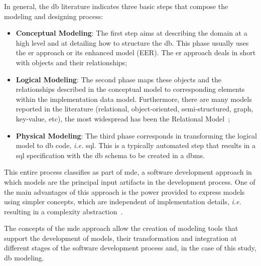 In general, the \ac{db} literature indicates three basic steps that compose the modeling and designing process:
\begin{itemize}
    \item \textbf{Conceptual Modeling}: The first step aims at describing the domain at a high level and at detailing how to structure the \ac{db}.
    This phase usually uses the \ac{er} approach or its enhanced model (EER).
    The \ac{er} approach deals in short with objects and their relationships;
    
    \item \textbf{Logical Modeling}: The second phase maps these objects and the relationships described in the conceptual model to corresponding elements within the implementation data model.
    Furthermore, there are many models reported in the literature (relational, object-oriented, semi-structured, graph, key-value, etc), the most widespread has been the Relational Model~\cite{Codd:1989, Karanikolas:2011, Paredaens:2012, Robinson:2015, Puangsaijai:2017};

    \item \textbf{Physical Modeling}: The third phase corresponds in transforming the logical model to \ac{db} code, \textit{i.e.} \ac{sql}.
This is a typically automated step that results in a \ac{sql} specification with the \ac{db} schema to be created in a \ac{dbms}.
\end{itemize}


This entire process classifies as part of \ac{mde}, a software development approach in which models are the principal input artifacts in the development process.
One of the main advantages of this approach is the power provided to express models using simpler concepts, which are independent of implementation details, \textit{i.e.} resulting in a complexity abstraction~\cite{Brambilla:2017}.

The concepts of the \ac{mde} approach allow the creation of modeling tools that support the development of models, their transformation and integration at different stages of the software development process and, in the case of this study, \ac{db} modeling.

